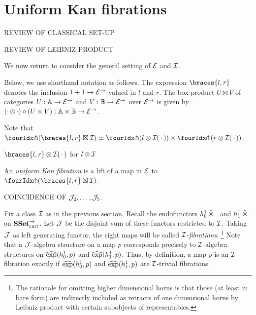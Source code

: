 \documentclass[reqno,10pt,a4paper,oneside]{amsart}
\begin{document}
\section{Uniform Kan fibrations}

REVIEW OF CLASSICAL SET-UP

REVIEW OF LEIBNIZ PRODUCT


We now return to consider the general setting of $\catE$ and $\cal{I}$.

Below, we use shorthand notation as follows.
The expression $\braces{l, r}$ denotes the inclusion $1 + 1 \to \catE^{\to}$ valued in $l$ and $r$.
The box product $U \boxtimes V$ of categories $U : \cat{A} \to \catE^{\to}$ and $V : \cat{B} \to \catE^{\to}$ over $\catE^{\to}$ is given by $(\arghole \otimes \arghole) \cc (U \times V) : \cat{A} \times \cat{B} \to \catE^{\to}$.


Note that $\liftr{(\braces{\intervall, \intervalr} \boxtimes \cal{I})} \simeq \liftr{(l \otimes \cal{I}\brarghole)} \times \liftr{(r \otimes \cal{I}\brarghole)}$.


 $\braces{l, r} \otimes \cal{I}\brarghole$ for $l \otimes \cal{I}$


\begin{definition} 
An \emph{uniform Kan fibration} is a lift of a map in $\catE$ to $\liftr{(\braces{\intervall, \intervalr} \boxtimes \cal{I})}$.
\end{definition} 






COINCIDENCE OF $\mathcal{J}_2, \ldots, \cal{J}_5$.



Fix a class $\cal{I}$ as in the previous section.
Recall the endofunctors $h_0^1 \hattimes \arghole$ and $h_1^1 \hattimes \arghole$ on $\SSetCart$.
Let $\cal{J}$ be the disjoint sum of these functors restricted to $\cal{I}$.
Taking $\cal{J}$ as left generating functor, the right maps will be called \emph{$\cal{I}$-fibrations}.
\footnote{The rationale for omitting higher dimensional horns is that those (at least in bare form) are indirectly included as retracts of one dimensional horns by Leibniz product with certain subobjects of representables.}
Note that a $\cal{J}$-algebra structure on a map $p$ corresponds precisely to $\cal{I}$-algebra structures on $\hatexp(h_0^1, p)$ and $\hatexp(h_1^1, p)$.
Thus, by definition, a map $p$ is an $\cal{I}$-fibration exactly if $\hatexp(h_0^1, p)$ and $\hatexp(h_1^1, p)$ are $\cal{I}$-trivial fibrations.
\end{document}
